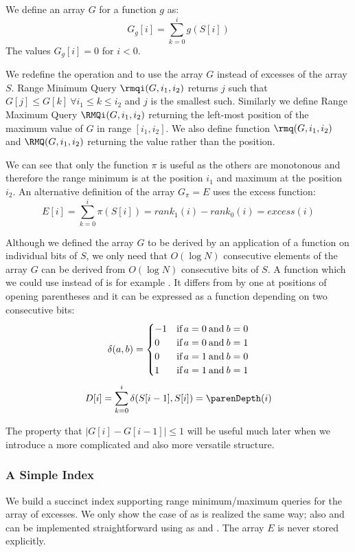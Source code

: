 We define an array $G$ for a function $g$ as:
$$ G_g[i] = \sum_{k = 0}^i g(S[i]) $$
The values $G_g[i] = 0$ for $i < 0$.

\bigbreak

We redefine the operation \rmqi and \RMQi to use the array $G$ instead of excesses of the array $S$.
Range Minimum Query $\rmqi(G, i_1, i_2)$ returns $j$ such that $G[j] \le G[k] \:\forall i_1 \le k \le i_2$ and $j$ is the smallest such.
Similarly we define Range Maximum Query $\RMQi(G, i_1, i_2)$ returning the left-most position of the maximum value of $G$ in range $[i_1, i_2]$.
We also define function $\rmq(G, i_1, i_2)$ and $\RMQ(G, i_1, i_2)$ returning the value rather than the position.

We can see that only the function $\pi$ is useful as the others are monotonous and therefore the range minimum is at the position $i_1$ and maximum at the position $i_2$.
An alternative definition of the array $G_\pi = E$ uses the excess function:
$$ E[i] = \sum_{k=0}^i \pi(S[i]) = rank_1(i) - rank_0(i) = excess(i) $$

\bigbreak

Although we defined the array $G$ to be derived by an application of a function on individual bits of $S$, we only need that $O(\log N)$ consecutive elements of the array $G$ can be derived from $O(\log N)$ consecutive bits of $S$.
A function which we could use instead of \excess{} is for example \parenDepth{}.
It differs from \excess{} by one at positions of opening parentheses and it can be expressed as a function depending on two consecutive bits:
$$\delta(a, b) = 
\begin{cases}
-1 &\operatorname{\textrm{if}} a = 0 \mathbin{\textrm{and}} b = 0 \\
0 &\operatorname{\textrm{if}} a = 0 \mathbin{\textrm{and}} b = 1 \\
0 &\operatorname{\textrm{if}} a = 1 \mathbin{\textrm{and}} b = 0 \\
1 &\operatorname{\textrm{if}} a = 1 \mathbin{\textrm{and}} b = 1
\end{cases}$$
$$ D[i] = \sum_{k=0}^i \delta(S[i - 1], S[i]) = \parenDepth(i) $$

The property that $| G[i] - G[i-1] | \le 1$ will be useful much later when we introduce a more complicated and also more versatile structure.

\subsubsection{A Simple Index}

We build a succinct index supporting range minimum/maximum queries for the array of excesses.
We only show the case of \rmqi{} as \RMQi{} is realized the same way; also \rmq{} and \RMQ{} can be implemented straightforward using \rmqi{} as \RMQi{} and \excess{}.
The array $E$ is never stored explicitly.

